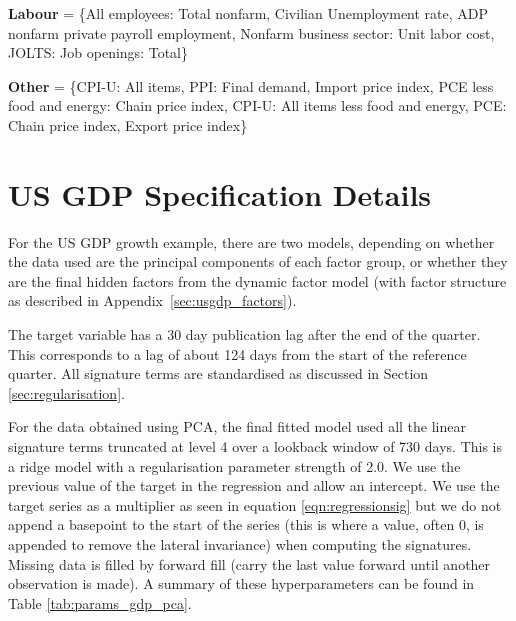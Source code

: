 \documentclass[a4paper, 12pt]{article}
\theoremstyle{remark}
\begin{document}
\vspace{1em}

\noindent \textbf{Labour} = \{All employees: Total nonfarm, Civilian Unemployment rate, ADP nonfarm private payroll employment, Nonfarm business sector: Unit labor cost, JOLTS: Job openings: Total\}

\vspace{1em}

\noindent \textbf{Other} = \{CPI-U: All items, PPI: Final demand, Import price index, PCE less food and energy: Chain price index, CPI-U: All items less food and energy, PCE: Chain price index, Export price index\}

\section{US GDP Specification Details}\label{sec:hyperparams_us}

For the US GDP growth example, there are two models, depending on whether the data used are the principal components of each factor group, or whether they are the final hidden factors from the dynamic factor model (with factor structure as described in Appendix~\ref{sec:usgdp_factors}).

The target variable has a 30 day publication lag after the end of the quarter. This corresponds to a lag of about 124 days from the start of the reference quarter. All signature terms are standardised as discussed in Section \ref{sec:regularisation}.

For the data obtained using PCA, the final fitted model used all the linear signature terms truncated at level 4 over a lookback window of 730 days. This is a ridge model with a regularisation parameter strength of 2.0. We use the previous value of the target in the regression and allow an intercept. We use the target series as a multiplier as seen in equation \eqref{eqn:regressionsig} but we do not append a basepoint to the start of the series (this is where a value, often 0, is appended to remove the lateral invariance) when computing the signatures. Missing data is filled by forward fill (carry the last value forward until another observation is made). A summary of these hyperparameters can be found in Table \ref{tab:params_gdp_pca}.
\end{document}
